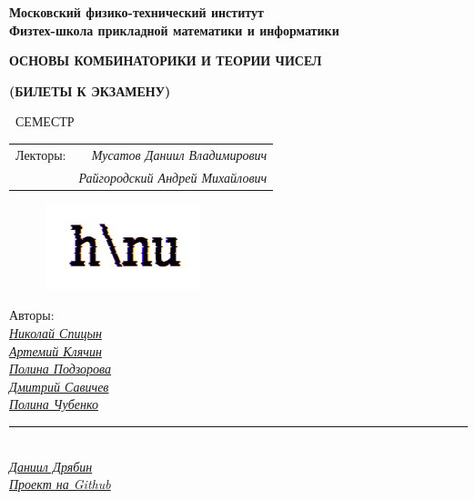 
\newcommand{\GithubLink}{https://github.com/MIPT-Group/Lectures_Tex_Club}

\begin{titlepage}
	\clearpage\thispagestyle{empty}
	\centering
	
	
	\textbf{Московский физико-технический институт \\ Физтех-школа прикладной математики и информатики}
	\vspace{20ex}
	\vspace{13ex}
	
	{\textbf{{ОСНОВЫ КОМБИНАТОРИКИ И ТЕОРИИ ЧИСЕЛ}}}

	{\textbf{(БИЛЕТЫ К ЭКЗАМЕНУ)}}
	
	\SemesterNumber\ СЕМЕСТР  
	\vspace{3ex}
	
	\begin{tabular}{rr}
		Лекторы:\hspace{-16pt} & \textit{Мусатов Даниил Владимирович}
		\\
		& \textit{Райгородский Андрей Михайлович}
	\end{tabular}
	
	\begin{figure}[!ht]
		\centering
		\includegraphics[width=0.4\textwidth]{images/logo_ltc.png}
	\end{figure}

	\begin{flushright}
		\noindent
		Авторы: 
		\\
		\href{https://vk.com/spitsynn}{\textit{Николай Спицын}}
		\\
		\href{https://vk.com/id340504554}{\textit{Артемий Клячин}}
		\\
		\href{https://vk.com/id165779384}{\textit{Полина Подзорова}}
		\\
		\href{https://vk.com/dimasav123}{\textit{Дмитрий Савичев}}
		\\
		\href{https://vk.com/poli.dobro}{\textit{Полина Чубенко}}
		\\
		\rule{90pt}{0.5pt}
		\\
		\href{https://vk.com/ax_equals_b}{\textit{Даниил Дрябин}}
		\\
		\href{\GithubLink}{\textit{Проект на Github}}
	\end{flushright}
	
	\vfill
	\CourseDate
	\pagebreak
\end{titlepage}